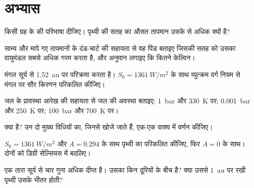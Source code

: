 \section{अभ्यास}

\begin{exercise}[$\star$]\label{exo:g10:habitable-planet:1}
किसी ग्रह के  की परिभाषा दीजिए। पृथ्वी की सतह का औसत तापमान उसके  से अधिक क्यों है?
\end{exercise}

\begin{exercise}[$\star$]\label{exo:g10:habitable-planet:2}
साम्य और मापे गए तापमानों के दंड-चार्ट की सहायता से वह पिंड बताइए जिसकी सतह को उसका
वायुमंडल सबसे अधिक गरम करता है, और अनुमान लगाइए कि कितने
केल्विन।
\end{exercise}

\begin{exercise}[$\star$]\label{exo:g10:habitable-planet:3}
मंगल सूर्य से \qty{1.52}{au} पर परिक्रमा करता है।
$S_0 = \qty{1361}{W/m^2}$ के साथ व्युत्क्रम वर्ग नियम से मंगल पर सौर किरणन परिकलित कीजिए।
\end{exercise}

\begin{exercise}[$\star$]\label{exo:g10:habitable-planet:4}
जल के प्रावस्था आरेख की सहायता से जल की अवस्था बताइए: \qty{1}{bar}
और \qty{330}{K} पर; \qty{0.001}{bar} और \qty{250}{K} पर; \qty{100}{bar} और
\qty{700}{K} पर।
\end{exercise}

\begin{exercise}[$\star$]\label{exo:g10:habitable-planet:5}
 क्या है? उन दो मुख्य विधियों का, जिनसे  खोजे जाते हैं, एक-एक वाक्य में
वर्णन कीजिए।
\end{exercise}

\begin{exercise}[$\star\star$]\label{exo:g10:habitable-planet:6}
$S_0 = \qty{1361}{W/m^2}$ और $A = 0.294$ के साथ पृथ्वी का 
परिकलित कीजिए, फिर $A = 0$ के साथ। दोनों को डिग्री सेल्सियस में बदलिए।
\end{exercise}

\begin{exercise}[$\star\star$]\label{exo:g10:habitable-planet:7}
एक तारा सूर्य से चार गुना अधिक दीप्त है। उसका  किन दूरियों के बीच है?
क्या उससे \qty{1}{au} पर रखी पृथ्वी उसके
भीतर होती?
\end{exercise}

